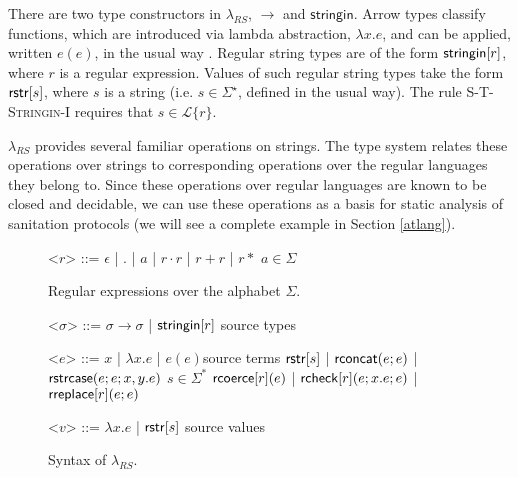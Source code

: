 \documentclass[9pt]{sig-alternate}
\newcommand{\todo}[1]{{\color{red} #1}}
\theoremstyle{definition}
\newcommand{\Lagr}{\mathcal{L}}
\newcommand{\lang}[1]{\Lagr\{#1\}}
\newcommand{\lambdas}{\lambda_{RS}}
\newcommand{\sisubst}[3]{{\sf rreplace}[#1](#2;#3)} \newcommand{\rreplace}[3]{{\sf rreplace}[#1](#2;#3)} %
\newcommand{\rcoerce}[2]{{\sf rcoerce}[#1](#2)}
\newcommand{\sistr}[1]{{\sf rstr}[#1]}   \newcommand{\rstr}[1]{{\sf rstr}[#1]} %
\newcommand{\rcheck}[4]{ {\sf rcheck}[#1](#2;#3;#4) }
\newcommand{\strin}[1]{\sistr{#1}}
\newcommand{\rsconcat}[2]{{\sf rconcat}(#1;#2)} \newcommand{\rconcat}[2]{{\sf rconcat}(#1;#2)} %
\newcommand{\stringin}[1]{{\sf stringin}[#1]}
\newcommand{\strcase}[3]{ {\sf rstrcase}(#1; #2; #3)}
\begin{document}
There are two type constructors in $\lambdas$, $\rightarrow$ and $\textsf{stringin}$. Arrow types classify functions, which are introduced via lambda abstraction, $\lambda x.e$, and can be applied, written $e(e)$, in the usual way \cite{pfpl}. Regular string types are of the form $\stringin{r}$, where $r$ is a regular expression. Values of such regular string types take the form $\strin{s}$, where $s$ is a string (i.e. $s \in \Sigma^\star$, defined in the usual way). The rule \textsc{S-T-Stringin-I} requires that $s \in \lang{r}$.


$\lambdas$ provides several familiar operations on strings. The type system  relates these operations over strings to corresponding operations over the  regular languages they belong to. 
Since these operations over regular languages are known to be closed and decidable, we can use these operations as a basis for static analysis of sanitation protocols (we will see a complete example in Section \ref{atlang}).





\renewcommand{\grammarlabel}[2]{#1\hfill#2}
\begin{figure}[t]
\small
  \begin{grammar}
<$r$> ::= $\epsilon$ | $.$ | $a$ | $r \cdot r$ | $r + r$ | $r*$ \hfill $a \in \Sigma$

\caption{Regular expressions over the alphabet $\Sigma$.}
\label{fig:regex}
\end{grammar}
\end{figure}
\begin{figure}[t]
\small
  \begin{grammar}
<$\sigma$> ::=  $\sigma \rightarrow \sigma$ | $\stringin{r}$    \hfill  source types

<$e$> ::= 
      $x$ | $\lambda x . e$ | $e(e) $\hfill source terms \alt 
      $\strin{s}$ | $\rsconcat{e}{e}$ | $\strcase{e}{e}{x,y.e}$ \hfill $s \in \Sigma^{*}$ \alt
      $\rcoerce{r}{e}$ | $\rcheck{r}{e}{x.e}{e}$ | $\sisubst{r}{e}{e}$ 

<$v$> ::= $\lambda x . e$ | $\strin{s}$ \hfill source values 
\caption{Syntax of $\lambda_{RS}$.}
\label{fig:glambdas}
\end{grammar}
\end{figure}
\end{document}
